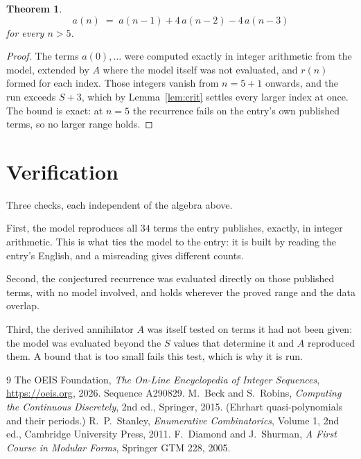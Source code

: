 \documentclass[11pt,a4paper]{article}
\theoremstyle{plain}
\newtheorem{theorem}{Theorem}
\theoremstyle{definition}
\begin{document}
\begin{theorem}
\[
a(n)\;=\;a(n-1) + 4\,a(n-2) - 4\,a(n-3)
\]
for every $n>5$.
\end{theorem}

\begin{proof}
The terms $a(0),\dots$ were computed exactly in integer arithmetic from the model, extended by
$A$ where the model itself was not evaluated, and $r(n)$ formed for each index. Those integers
vanish from $n=5+1$ onwards, and the run exceeds $S+3$, which by
Lemma~\ref{lem:crit} settles every larger index at once. The bound is exact: at $n=5$ the recurrence fails on the entry's own published terms, so no larger range holds.
\end{proof}

\section{Verification}

Three checks, each independent of the algebra above.

First, the model reproduces all $34$ terms the entry publishes, exactly, in integer
arithmetic. This is what ties the model to the entry: it is built by reading the entry's
English, and a misreading gives different counts.

Second, the conjectured recurrence was evaluated directly on those published terms, with no
model involved, and holds wherever the proved range and the data overlap.

Third, the derived annihilator $A$ was itself tested on terms it had not been given: the model
was evaluated beyond the $S$ values that determine it and $A$ reproduced them. A bound that is
too small fails this test, which is why it is run.

\begin{thebibliography}{9}
 The OEIS Foundation, \emph{The On-Line Encyclopedia of Integer
Sequences}, \url{https://oeis.org}, 2026. Sequence A290829.
 M.~Beck and S.~Robins, \emph{Computing the Continuous Discretely},
2nd ed., Springer, 2015. (Ehrhart quasi-polynomials and their periods.)
 R.~P.~Stanley, \emph{Enumerative Combinatorics}, Volume 1, 2nd ed.,
Cambridge University Press, 2011.
 F.~Diamond and J.~Shurman, \emph{A First Course in Modular Forms},
Springer GTM 228, 2005.
\end{thebibliography}
\end{document}
